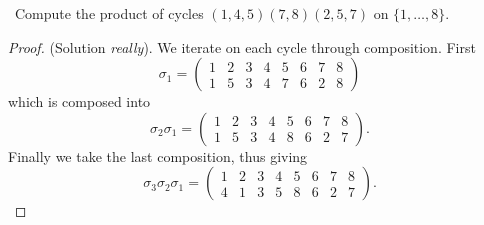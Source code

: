 \documentclass[11pt]{amsart}
\begin{document}
\medskip {}\ Compute the product of cycles $(1, 4, 5)(7,8)(2,5,7)$ on $\{1, \dots, 8\}.$
\begin{proof}
(Solution \emph{really}). We iterate on each cycle through composition. First
\begin{equation*}
	\sigma_1 = \begin{pmatrix}
		1 & 2 & 3 & 4 & 5 & 6 & 7 & 8 \\
		1 & 5 & 3 & 4 & 7 & 6 & 2 & 8
	\end{pmatrix}
\end{equation*}
which is composed into
\begin{equation*}
	\sigma_2\sigma_1 = \begin{pmatrix}
		1 & 2 & 3 & 4 & 5 & 6 & 7 & 8 \\
		1 & 5 & 3 & 4 & 8 & 6 & 2 & 7
	\end{pmatrix}.
\end{equation*}
Finally we take the last composition, thus giving
\begin{equation*}
	\sigma_3\sigma_2\sigma_1 = \begin{pmatrix}
		1 & 2 & 3 & 4 & 5 & 6 & 7 & 8 \\
		4 & 1 & 3 & 5 & 8 & 6 & 2 & 7
	\end{pmatrix}.
\end{equation*}
\end{proof}
\end{document}

